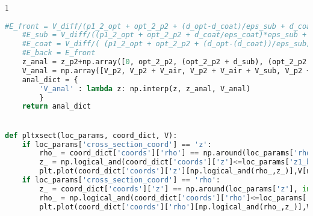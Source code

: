 \begin{spacing}{1}
\begin{lstlisting}[frame=single, language=Python]
    #E_front = V_diff/(p1_2_opt + opt_2_p2 + (d_opt-d_coat)/eps_sub + d_coat/eps_coat)
    #E_sub = V_diff/((p1_2_opt + opt_2_p2 + d_coat/eps_coat)*eps_sub + (d_opt-d_coat))
    #E_coat = V_diff/( (p1_2_opt + opt_2_p2 + (d_opt-(d_coat))/eps_sub)*eps_coat + d_coat)
    #E_back = E_front
    z_anal = z_p2+np.array([0, opt_2_p2, (opt_2_p2 + d_sub), (opt_2_p2 + d_sub + d_coat), (opt_2_p2 + d_sub + d_coat + opt_2_p2)])
    V_anal = np.array([V_p2, V_p2 + V_air, V_p2 + V_air + V_sub, V_p2 + V_air + V_sub + V_coat, V_p1])
    anal_dict = {
        'V_anal' : lambda z: np.interp(z, z_anal, V_anal)
        }
    return anal_dict


def pltxsect(loc_params, coord_dict, V): 
    if loc_params['cross_section_coord'] == 'z':
        rho_ = coord_dict['coords']['rho'] == np.around(loc_params['rho'], int(abs(np.log10(coord_dict['coords']['rho'][1]))))
        z_ = np.logical_and(coord_dict['coords']['z']<=loc_params['z1_bound'], coord_dict['coords']['z']>=loc_params['z2_bound'])
        plt.plot(coord_dict['coords']['z'][np.logical_and(rho_,z_)],V[np.logical_and(rho_, z_)])
    if loc_params['cross_section_coord'] == 'rho':
        z_ = coord_dict['coords']['z'] == np.around(loc_params['z'], int(abs(np.log10(coord_dict['coords']['z'][1]))))
        rho_ = np.logical_and(coord_dict['coords']['rho']<=loc_params['rho2_bound'], coord_dict['coords']['rho']>=loc_params['rho1_bound'])
        plt.plot(coord_dict['coords']['rho'][np.logical_and(rho_,z_)],V[np.logical_and(rho_, z_)])
\end{lstlisting}
\end{spacing}
